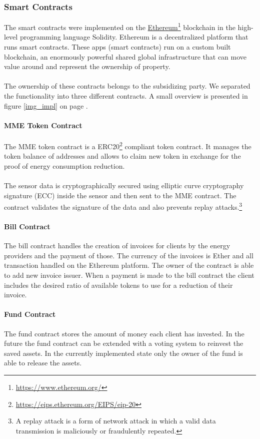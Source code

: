 \documentclass[11pt]{article}
\begin{document}
\subsubsection{Smart Contracts}
The smart contracts were implemented on the \hyperref[https://www.ethereum.org/]{Ethereum}\footnote{\href{https://www.ethereum.org/}{https://www.ethereum.org/}} blockchain in the high-level programming language Solidity. Ethereum is a decentralized platform that runs smart contracts. These apps (smart contracts) run on a custom built blockchain, an enormously powerful shared global infrastructure that can move value around and represent the ownership of property.\cite{23}\\\\
The ownership of these contracts belongs to the subsidizing party.
We separated the functionality into three different contracts. A small overview is presented in figure \ref{img_impl} on page \pageref{img_impl}.


\paragraph{MME Token Contract}
The MME token contract is a ERC20\footnote{\href{https://eips.ethereum.org/EIPS/eip-20}{https://eips.ethereum.org/EIPS/eip-20}} compliant token contract. It manages the token balance of addresses and allows to claim new token in exchange for the proof of energy consumption reduction. \\\\
The sensor data is cryptographically secured using elliptic curve cryptography signature (ECC) \cite{24} inside the sensor and then sent to the MME contract. The contract validates the signature of the data and also prevents replay attacks.\footnote{A replay attack is a form of network attack in which a valid data transmission is maliciously or fraudulently repeated.}
\paragraph{Bill Contract}
The bill contract handles the creation of invoices for clients by the energy providers and the payment of those. The currency of the invoices is Ether and all transaction handled on the Ethereum platform. The owner of the contract is able to add new invoice issuer. When a payment is made to the bill contract the client includes the desired ratio of available tokens to use for a reduction of their invoice.
\paragraph{Fund Contract}
The fund contract stores the amount of money each client has invested. In the future the fund contract can be extended with a voting system to reinvest the saved assets. In the currently implemented state only the owner of the fund is able to release the assets.
\end{document}
